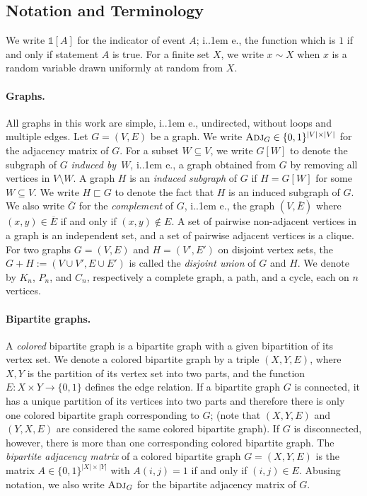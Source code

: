 \documentclass{theoretics}
\makeatletter
\newcommand{\ind}[1]{\mathds{1} \left[ #1 \right] }
\newcommand{\zo}{\{0,1\}}
\newcommand{\Adj}{\textsc{Adj}}
\newcommand*\ie{i.\kern.1em e.\@\xspace} %
\makeatother
\begin{document}
\subsection{Notation and Terminology}
\label{section:notation}

We write $\ind{A}$ for the indicator of event $A$; \ie, the function which is $1$ if and only if
statement $A$ is true. For a finite set $X$, we write $x \sim X$ when $x$ is a random variable drawn
uniformly at random from $X$.

\paragraph{Graphs.}
All graphs in this work are simple, \ie, undirected, without loops and multiple edges.  Let
$G=(V,E)$ be a graph. We write $\Adj_G \in \zo^{|V| \times |V|}$ for the adjacency matrix of $G$.
For a subset $W \subseteq V$, we write $G[W]$ to denote the subgraph of $G$ \emph{induced by}~$W$,
\ie, a graph obtained from $G$ by removing all vertices in $V \setminus W$.  A graph $H$ is an
\emph{induced subgraph} of $G$ if $H = G[W]$ for some $W \subseteq V$.  We write $H \sqsubset G$ to
denote the fact that $H$ is an induced subgraph of $G$.  We also write $\overline G$ for the
\emph{complement} of $G$, \ie, the graph $(V,\overline E)$ where $(x,y)\in \overline E$ if and only
if $(x,y)\notin E$.  A set of pairwise non-adjacent vertices in a graph is an independent set, and a
set of pairwise adjacent vertices is a clique.
%
For two graphs $G = (V, E)$ and $H = (V', E')$ on disjoint vertex sets, the $G + H := (V \cup V', E
\cup E')$ is called the \emph{disjoint union} of $G$ and $H$.
%
We denote by $K_n$, $P_n$, and $C_n$, respectively a complete graph, a path, and a cycle, each on
$n$ vertices.

\paragraph{Bipartite graphs.}
A \emph{colored} bipartite graph is a bipartite graph with a given bipartition of its vertex set.
We denote a colored bipartite graph by a triple $(X,Y,E)$, where $X,Y$ is the partition of its
vertex set into two parts, and the function $E : X \times Y \to \zo$ defines the edge relation. If a
bipartite graph $G$ is connected, it has a unique partition of its vertices into two parts and
therefore there is only one colored bipartite graph corresponding to $G$; (note that $(X,Y,E)$ and
$(Y,X,E)$ are considered the same colored bipartite graph).  If $G$ is disconnected, however, there
is more than one corresponding colored bipartite graph.  The \emph{bipartite adjacency matrix} of a
colored bipartite graph $G = (X,Y,E)$ is the matrix $A \in \zo^{|X| \times |Y|}$ with $A(i,j) = 1$
if and only if $(i,j) \in E$. Abusing notation, we also write $\Adj_G$ for the bipartite adjacency
matrix of $G$.
\end{document}
